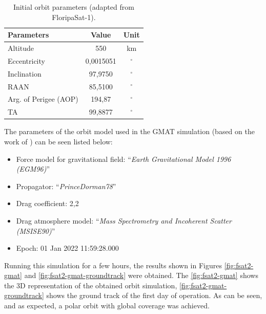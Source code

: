 
\begin{table}[!ht]
    \centering
    \begin{tabular}{lcc}
        \toprule[1.5pt]
        \textbf{Parameters} & \textbf{Value} & \textbf{Unit} \\
        \midrule
        Altitude                & 550           & km \\
        Eccentricity            & 0,0015051     & $^{\circ}$ \\
        Inclination             & 97,9750       & $^{\circ}$ \\
        RAAN                    & 85,5100       & $^{\circ}$ \\
        Arg. of Perigee (AOP)   & 194,87        & $^{\circ}$ \\
        TA                      & 99,8877       & $^{\circ}$ \\
        \bottomrule[1.5pt]
    \end{tabular}
    \caption{Initial orbit parameters (adapted from FloripaSat-1).}
    \label{tab:orbit-parameters}
\end{table}

The parameters of the orbit model used in the GMAT simulation (based on the work of \cite{marino2016}) can be seen listed below:

\begin{itemize}
    \item Force model for gravitational field: ``\textit{Earth Gravitational Model 1996 (EGM96)}'' \cite{lemoine1998}
    \item Propagator: ``\textit{PrinceDorman78}''
    \item Drag coefficient: 2,2
    \item Drag atmosphere model: ``\textit{Mass Spectrometry and Incoherent Scatter (MSISE90)}'' \cite{hedin1991}
    \item Epoch: 01 Jan 2022 11:59:28.000
\end{itemize}

Running this simulation for a few hours, the results shown in Figures \ref{fig:fsat2-gmat} and \ref{fig:fsat2-gmat-groundtrack} were obtained. The \autoref{fig:fsat2-gmat} shows the 3D representation of the obtained orbit simulation, \autoref{fig:fsat2-gmat-groundtrack} shows the ground track of the first day of operation. As can be seen, and as expected, a polar orbit with global coverage was achieved.

